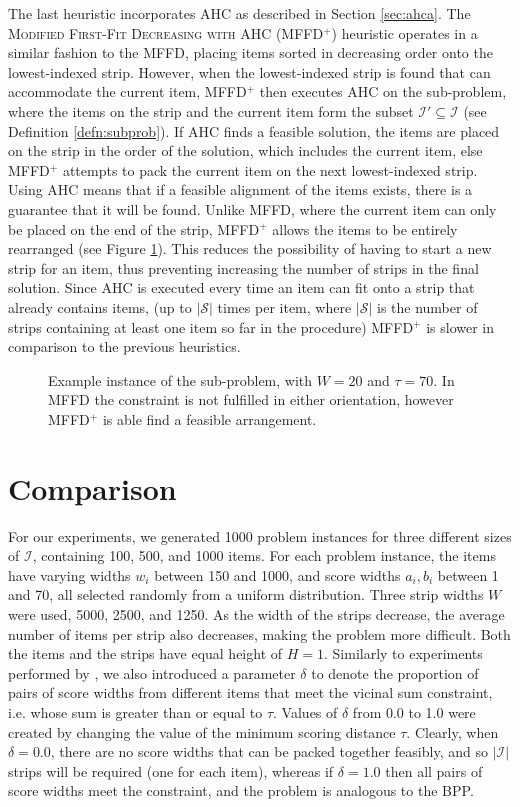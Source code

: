 \documentclass[oribibl]{llncs}
\begin{document}
The last heuristic incorporates AHC as described in Section \ref{sec:ahca}. The \textsc{Modified First-Fit Decreasing with AHC} (MFFD$^+$) heuristic operates in a similar fashion to the MFFD, placing items sorted in decreasing order onto the lowest-indexed strip. However, when the lowest-indexed strip is found that can accommodate the current item, MFFD$^+$ then executes AHC on the sub-problem, where the items on the strip and the current item form the subset $\mathcal{I}' \subseteq \mathcal{I}$ (see Definition \ref{defn:subprob}). If AHC finds a feasible solution, the items are placed on the strip in the order of the solution, which includes the current item, else MFFD$^+$ attempts to pack the current item on the next lowest-indexed strip. Using AHC means that if a feasible alignment of the items exists, there is a guarantee that it will be found. Unlike MFFD, where the current item can only be placed on the end of the strip, MFFD$^+$ allows the items to be entirely rearranged (see Figure \ref{fig:comparestrips}). This reduces the possibility of having to start a new strip for an item, thus preventing increasing the number of strips in the final solution. Since AHC is executed every time an item can fit onto a strip that already contains items, (up to $|\mathcal{S}|$ times per item, where $|\mathcal{S}|$ is the number of strips containing at least one item so far in the procedure) MFFD$^+$ is slower in comparison to the previous heuristics.  

\begin{figure}[h!]	
	\centering
	
	\caption{Example instance of the sub-problem, with $W = 20$ and $\tau = 70$. In MFFD the constraint is not fulfilled in either orientation, however MFFD$^+$ is able find a feasible arrangement.}	
	\label{fig:comparestrips}
\end{figure}


\section{Comparison}
For our experiments, we generated 1000 problem instances for three different sizes of $\mathcal{I}$, containing 100, 500, and 1000 items. For each problem instance, the items have varying widths $w_i$ between 150 and 1000, and score widths $a_i, b_i$ between 1 and 70, all selected randomly from a uniform distribution. Three strip widths $W$ were used, 5000, 2500, and 1250. As the width of the strips decrease, the average number of items per strip also decreases, making the problem more difficult. Both the items and the strips have equal height of $H = 1$. Similarly to experiments performed by \cite{lewis2011}, we also introduced a parameter $\delta$ to denote the proportion of pairs of score widths from different items that meet the vicinal sum constraint, i.e. whose sum is greater than or equal to $\tau$. Values of $\delta$ from 0.0 to 1.0 were created by changing the value of the minimum scoring distance $\tau$. Clearly, when $\delta = 0.0$, there are no score widths that can be packed together feasibly, and so $|\mathcal{I}|$ strips will be required (one for each item), whereas if $\delta = 1.0$ then all pairs of score widths meet the constraint, and the problem is analogous to the BPP.
\end{document}
